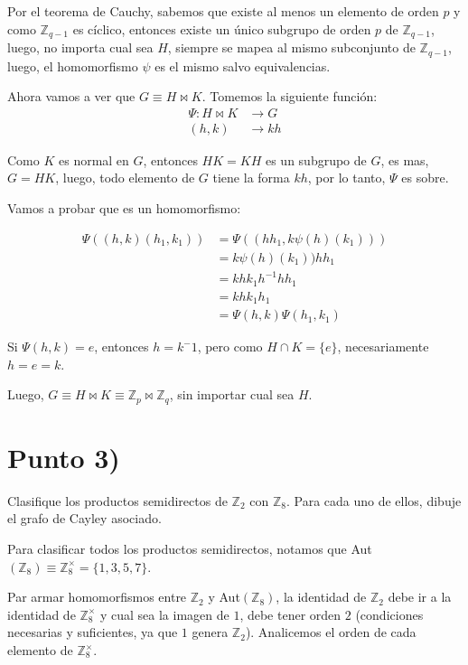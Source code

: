 \documentclass{article}
\begin{document}
    Por el teorema de Cauchy, sabemos que existe al menos un elemento de orden $p$ y 
    como $\mathbb{Z}_{q - 1}$ es cíclico, entonces existe un único subgrupo de orden 
    $p$ de $\mathbb{Z}_{q-1}$, luego, no importa cual sea $H$, siempre se mapea al mismo subconjunto de $\mathbb{Z}_{q-1}$, 
    luego, el homomorfismo $\psi$ es el mismo salvo equivalencias.

    Ahora vamos a ver que $G \equiv H \Join K$. Tomemos la siguiente función:
    \[
      \begin{aligned}
        \Psi: H \Join K &\to G \\
        (h, k) &\to kh 
      \end{aligned}
    \]

    Como $K$ es normal en $G$, entonces $HK = KH$ es un subgrupo de $G$, es mas, 
    $G = HK$, luego, todo elemento de $G$ tiene la forma $kh$, por lo tanto, $\Psi$ es sobre.

    Vamos a probar que es un homomorfismo:

    \[
      \begin{aligned}
        \Psi((h, k)(h_1, k_1)) &= \Psi((hh_1, k\psi(h)(k_1))) \\
        &= k \psi(h)(k_1))hh_1 \\
        &= k h k_1 h^{-1} h h_1 \\
        &= k h k_1 h_1 \\
        &= \Psi(h, k) \Psi(h_1, k_1)
      \end{aligned}
    \]
    

    Si $\Psi(h, k) = e$, entonces $h = k^-1$, pero como $H \cap K = \{e\}$, necesariamente $h = e = k$.

    Luego, $G \equiv H \Join K \equiv \mathbb{Z}_p \Join \mathbb{Z}_q$, sin importar cual sea $H$.

  \section{Punto 3)}
    Clasifique los productos semidirectos de $\mathbb{Z}_2$ con $\mathbb{Z}_8$. Para cada uno 
    de ellos, dibuje el grafo de Cayley asociado.

    Para clasificar todos los productos semidirectos, notamos que Aut$(\mathbb{Z}_8) \equiv \mathbb{Z}_8^\times = \{1, 3, 5, 7\}$.

    Par armar homomorfismos entre $\mathbb{Z}_2$ y Aut$(\mathbb{Z}_8)$, la identidad de 
    $\mathbb{Z}_2$ debe ir a la identidad de $\mathbb{Z}_8 ^\times$ y cual sea la imagen de $1$, debe tener orden $2$ 
    (condiciones necesarias y suficientes, ya que $1$ genera $\mathbb{Z}_2$). Analicemos el orden de cada elemento de $\mathbb{Z}_8^\times$.
    
\end{document}
